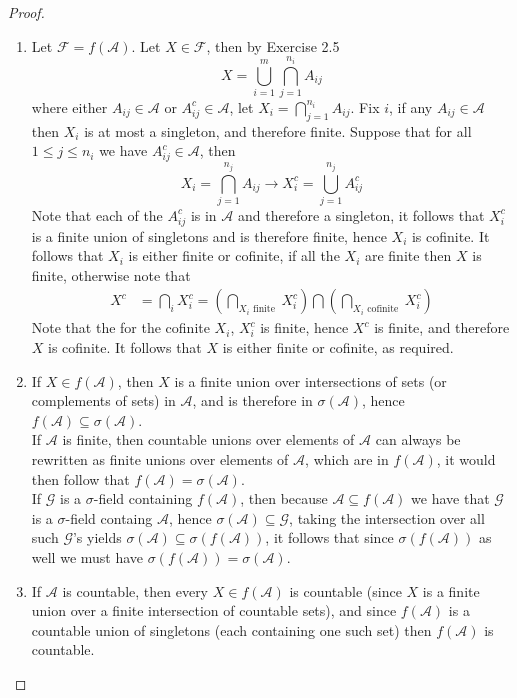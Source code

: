 \documentclass[11pt]{article}
\newcommand{\F}{\mathcal{F}}
\newcommand{\A}{\mathcal{A}}
\newcommand{\G}{\mathcal{G}}
\newcommand{\seq}{\subseteq}
\begin{document}
\begin{proof}
    \begin{enumerate}
        \item Let $\F = f(\A)$. Let $X \in \F$, then by Exercise 2.5 
        \[ X = \bigcup_{i=1}^{m} \bigcap_{j=1}^{n_i} A_{ij} \]
        where either $A_{ij} \in \A$ or $A_{ij}^c \in \A$, let $X_i = \bigcap_{j=1}^{n_i} A_{ij}$. Fix $i$, if any $A_{ij} \in \A$ then $X_i$ is at most a singleton, and therefore finite. Suppose that for all $1 \leq j \leq n_i$ we have $A_{ij}^{c} \in \A$, then
        \[ X_{i} = \bigcap_{j=1}^{n_j} A_{ij} \longrightarrow X_{i}^{c} = \bigcup_{j=1}^{n_j} A_{ij}^{c} \]
        Note that each of the $A_{ij}^{c}$ is in $\A$ and therefore a singleton, it follows that $X_i^{c}$ is a finite union of singletons and is therefore finite, hence $X_i$ is cofinite. It follows that $X_i$ is either finite or cofinite, if all the $X_i$ are finite then $X$ is finite, otherwise note that
        \begin{align*}
            X^{c} &= \bigcap_i X_i^{c} = \left (\bigcap_{X_i \text { finite }} X_i^{c} \right) \bigcap \left (\bigcap_{X_{i} \text { cofinite }} X_i^{c} \right) 
        \end{align*}
        Note that the for the cofinite $X_i$, $X_i^{c}$ is finite, hence $X^{c}$ is finite, and therefore $X$ is cofinite. It follows that $X$ is either finite or cofinite, as required.
        \item If $X \in f(\A)$, then $X$ is a finite union over intersections of sets (or complements of sets) in $\A$, and is therefore in $\sigma (\A)$, hence $f(\A) \seq \sigma (\A)$. \\
        If $\A$ is finite, then countable unions over elements of $\A$ can always be rewritten as finite unions over elements of $\A$, which are in $f(\A)$, it would then follow that $f(\A) = \sigma (\A)$. \\
        If $\G$ is a $\sigma$-field containing $f(\A)$, then because $\A \seq f(\A)$ we have that $\G$ is a $\sigma$-field containg $\A$, hence $\sigma (\A) \seq \G$, taking the intersection over all such $\G$'s yields $\sigma (\A) \seq \sigma (f (\A))$, it follows that since $\sigma (f(\A))$ as well we must have $\sigma (f(\A)) = \sigma (\A)$. 
        \item If $\A$ is countable, then every $X \in f(\A)$ is countable (since $X$ is a finite union over a finite intersection of countable sets), and since $f(\A)$ is a countable union of singletons (each containing one such set) then $f(\A)$ is countable.

\end{enumerate}
\end{proof}
\end{document}
